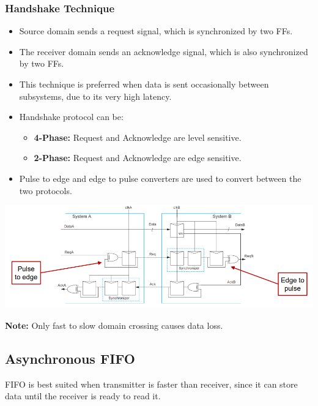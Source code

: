\documentclass[11pt]{article}
\begin{document}
\subsubsection*{Handshake Technique}
\begin{itemize}
    \item Source domain sends a request signal, which is synchronized by two FFs.
    \item The receiver domain sends an acknowledge signal, which is also synchronized by two FFs.
    \item This technique is preferred when data is sent occasionally between subsystems, due to its very high latency.
    \item Handshake protocol can be:
    \begin{itemize}
        \item \textbf{4-Phase:} Request and Acknowledge are level sensitive.
        \item \textbf{2-Phase:} Request and Acknowledge are edge sensitive.
    \end{itemize}
    \item Pulse to edge and edge to pulse converters are used to convert between the two protocols.
\end{itemize}
\begin{center}
    \includegraphics[scale=0.7]{4.png}
\end{center}
\textbf{Note:} Only fast to slow domain crossing causes data loss.

\pagebreak

\subsection*{Asynchronous FIFO}
FIFO is best suited when transmitter is faster than receiver, since it can store data until the receiver is ready to read it. 
\end{document}
